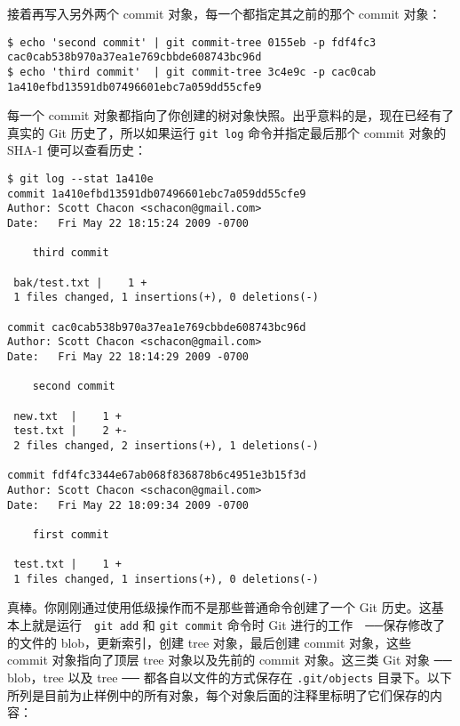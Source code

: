 \documentclass[a4paper]{book}
\begin{document}
接着再写入另外两个 commit 对象，每一个都指定其之前的那个 commit 对象：

\begin{shaded}\begin{verbatim}
$ echo 'second commit' | git commit-tree 0155eb -p fdf4fc3
cac0cab538b970a37ea1e769cbbde608743bc96d
$ echo 'third commit'  | git commit-tree 3c4e9c -p cac0cab
1a410efbd13591db07496601ebc7a059dd55cfe9
\end{verbatim}\end{shaded}

每一个 commit 对象都指向了你创建的树对象快照。出乎意料的是，现在已经有了真实的 Git 历史了，所以如果运行 \texttt{git log} 命令并指定最后那个 commit 对象的 SHA-1 便可以查看历史：

\begin{shaded}\begin{verbatim}
$ git log --stat 1a410e
commit 1a410efbd13591db07496601ebc7a059dd55cfe9
Author: Scott Chacon <schacon@gmail.com>
Date:   Fri May 22 18:15:24 2009 -0700

    third commit

 bak/test.txt |    1 +
 1 files changed, 1 insertions(+), 0 deletions(-)

commit cac0cab538b970a37ea1e769cbbde608743bc96d
Author: Scott Chacon <schacon@gmail.com>
Date:   Fri May 22 18:14:29 2009 -0700

    second commit

 new.txt  |    1 +
 test.txt |    2 +-
 2 files changed, 2 insertions(+), 1 deletions(-)

commit fdf4fc3344e67ab068f836878b6c4951e3b15f3d
Author: Scott Chacon <schacon@gmail.com>
Date:   Fri May 22 18:09:34 2009 -0700

    first commit

 test.txt |    1 +
 1 files changed, 1 insertions(+), 0 deletions(-)
\end{verbatim}\end{shaded}

真棒。你刚刚通过使用低级操作而不是那些普通命令创建了一个 Git 历史。这基本上就是运行　\texttt{git add} 和 \texttt{git commit} 命令时 Git 进行的工作　──保存修改了的文件的 blob，更新索引，创建 tree 对象，最后创建 commit 对象，这些 commit 对象指向了顶层 tree 对象以及先前的 commit 对象。这三类 Git 对象 ── blob，tree 以及 tree ── 都各自以文件的方式保存在 \texttt{.git/objects} 目录下。以下所列是目前为止样例中的所有对象，每个对象后面的注释里标明了它们保存的内容：
\end{document}
